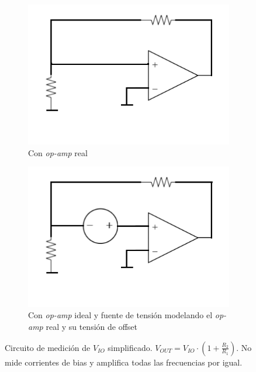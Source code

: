\documentclass[../../main.tex]{subfiles}
\begin{document}
\begin{figure}[htbp]	%
	\centering
	\begin{subfigure}[t]{0.43\textwidth}
		\centering
		\includegraphics[width=\textwidth]{imagenes/medicion_vio_configuracion_simplificada.png}
		\caption{Con \textit{op-amp} real}
	\end{subfigure}%
	\hfill%
	\begin{subfigure}[t]{0.43\textwidth}
		\centering
		\includegraphics[width=\textwidth]{imagenes/medicion_vio_configuracion_simplificada_opamp_ideal.png}
		\caption{Con \textit{op-amp} ideal y fuente de tensi\'on modelando el \textit{op-amp} real y su tensi\'on de offset}
	\end{subfigure}	
	\caption[Circuito de medici\'on de $V_{IO}$ simplificado.]{Circuito de medici\'on de $V_{IO}$ simplificado.  $V_{OUT} = V_{IO} \cdot \left( 1+ \frac{R_2}{R_1} \right) $. No mide corrientes de bias y amplifica todas las frecuencias por igual.}
	\label{fig:ej_3_medicion_vio_simple}
\end{figure}
\end{document}
